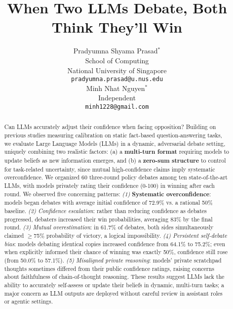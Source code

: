 \documentclass{article}
\title{When Two LLMs Debate, Both Think They'll Win}
\author{%
Pradyumna Shyama Prasad$^{*}$ \\ %
  School of Computing \\ %
  National University of Singapore \\ %
  \texttt{pradyumna.prasad@u.nus.edu} \\ %
  \And
  Minh Nhat Nguyen$^{*}$ \\
  Independent \\
  \texttt{minh1228@gmail.com} \\
}
\begin{document}
\maketitle



\begin{abstract}
  Can LLMs accurately adjust their confidence when facing opposition? Building on previous studies measuring calibration on static fact-based question-answering tasks, we evaluate Large Language Models (LLMs) in a dynamic, adversarial debate setting, uniquely combining two realistic factors: (a) a \textbf{multi-turn format} requiring models to update beliefs as new information emerges, and (b) a \textbf{zero-sum structure} to control for task-related uncertainty, since mutual high-confidence claims imply systematic overconfidence. We organized 60 three-round policy debates among ten state-of-the-art LLMs, with models privately rating their confidence (0-100) in winning after each round. We observed five concerning patterns: \textit{(1)} \textbf{Systematic overconfidence}: models began debates with average initial confidence of 72.9\% vs. a rational 50\% baseline. \textit{(2) Confidence escalation}: rather than reducing confidence as debates progressed, debaters increased their win probabilities, averaging 83\% by the final round. \textit{(3) Mutual overestimation}: in 61.7\% of debates, both sides simultaneously claimed $\geq$75\% probability of victory, a logical impossibility. \textit{(4) Persistent self-debate bias}: models debating identical copies increased confidence from 64.1\% to 75.2\%; even when explicitly informed their chance of winning was exactly 50\%, confidence still rose (from 50.0\% to 57.1\%). \textit{(5) Misaligned private reasoning}: models' private scratchpad thoughts sometimes differed from their public confidence ratings, raising concerns about faithfulness of chain-of-thought reasoning. These results suggest LLMs lack the ability to accurately self-assess or update their beliefs in dynamic, multi-turn tasks; a major concern as LLM outputs are deployed without careful review in assistant roles or agentic settings.
  \end{abstract}
\end{document}
